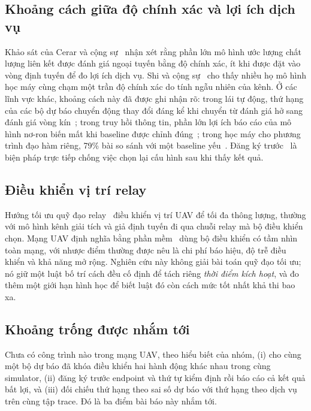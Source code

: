 \subsection{Khoảng cách giữa độ chính xác và lợi ích dịch vụ}
Khảo sát của Cerar và cộng sự~\cite{cerar} nhận xét rằng phần lớn mô hình ước
lượng chất lượng liên kết được đánh giá ngoại tuyến bằng độ chính xác, ít khi
được đặt vào vòng định tuyến để đo lợi ích dịch vụ. Shi và cộng
sự~\cite{shi2024} cho thấy nhiều họ mô hình học máy cùng chạm một trần độ chính
xác do tính ngẫu nhiên của kênh. Ở các lĩnh vực khác, khoảng cách này đã được
ghi nhận rõ: trong lái tự động, thứ hạng của các bộ dự báo chuyển động thay đổi
đáng kể khi chuyển từ đánh giá hở sang đánh giá vòng kín~\cite{closedloop2025};
trong truy hồi thông tin, phần lớn lợi ích báo cáo của mô hình nơ-ron biến mất
khi baseline được chỉnh đúng~\cite{lin2018}; trong học máy cho phương trình đạo
hàm riêng, 79\% bài so sánh với một baseline yếu~\cite{mcgreivy2024}. Đăng ký
trước~\cite{nosek} là biện pháp trực tiếp chống việc chọn lại cấu hình sau khi
thấy kết quả.

\subsection{Điều khiển vị trí relay}
Hướng tối ưu quỹ đạo relay~\cite{zeng2016} điều khiển vị trí UAV để tối đa
thông lượng, thường với mô hình kênh giải tích và giả định tuyến đi qua chuỗi
relay mà bộ điều khiển chọn. Mạng UAV định nghĩa bằng phần mềm~\cite{abir} dùng
bộ điều khiển có tầm nhìn toàn mạng, với nhược điểm thường được nêu là chi phí
báo hiệu, độ trễ điều khiển và khả năng mở rộng. Nghiên cứu này không giải bài
toán quỹ đạo tối ưu; nó giữ một luật bố trí cách đều cố định để tách riêng
\emph{thời điểm kích hoạt}, và đo thêm một giới hạn hình học để biết luật đó
còn cách mức tốt nhất khả thi bao xa.

\subsection{Khoảng trống được nhắm tới}
Chưa có công trình nào trong mạng UAV, theo hiểu biết của nhóm, (i) cho cùng
một bộ dự báo đã khóa điều khiển hai hành động khác nhau trong cùng simulator,
(ii) đăng ký trước endpoint và thứ tự kiểm định rồi báo cáo cả kết quả bất lợi,
và (iii) đối chiếu thứ hạng theo sai số dự báo với thứ hạng theo dịch vụ trên
cùng tập trace. Đó là ba điểm bài báo này nhắm tới.
